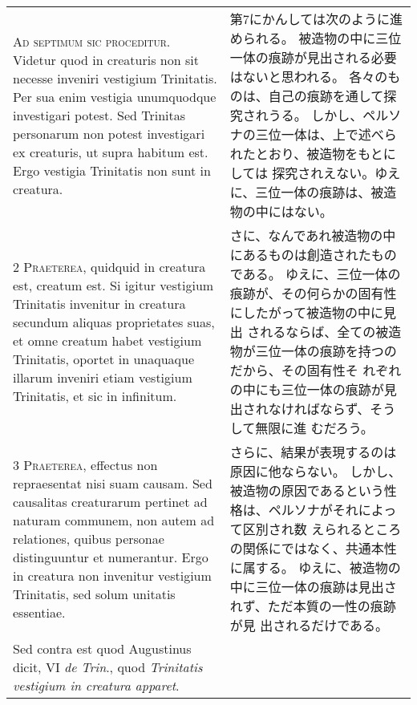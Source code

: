 \documentclass[10pt]{jsarticle} %
\begin{document}
\begin{longtable}{p{21em}p{21em}}

{\huge A}{\scshape d septimum sic proceditur}. Videtur quod in
 creaturis non sit necesse inveniri vestigium Trinitatis. Per sua enim
 vestigia unumquodque investigari potest. Sed Trinitas personarum non
 potest investigari ex creaturis, ut supra habitum est. Ergo vestigia
 Trinitatis non sunt in creatura.


&

第7にかんしては次のように進められる。
被造物の中に三位一体の痕跡が見出される必要はないと思われる。
各々のものは、自己の痕跡を通して探究されうる。
しかし、ペルソナの三位一体は、上で述べられたとおり、被造物をもとにしては
 探究されえない。ゆえに、三位一体の痕跡は、被造物の中にはない。

\\



{\scshape 2 Praeterea}, quidquid in creatura est,
 creatum est. Si igitur vestigium Trinitatis invenitur in creatura
 secundum aliquas proprietates suas, et omne creatum habet vestigium
 Trinitatis, oportet in unaquaque illarum inveniri etiam vestigium
 Trinitatis, et sic in infinitum.

&

さに、なんであれ被造物の中にあるものは創造されたものである。
ゆえに、三位一体の痕跡が、その何らかの固有性にしたがって被造物の中に見出
 されるならば、全ての被造物が三位一体の痕跡を持つのだから、その固有性そ
 れぞれの中にも三位一体の痕跡が見出されなければならず、そうして無限に進
 むだろう。

\\


{\scshape 3 Praeterea}, effectus non repraesentat nisi
 suam causam. Sed causalitas creaturarum pertinet ad naturam communem,
 non autem ad relationes, quibus personae distinguuntur et
 numerantur. Ergo in creatura non invenitur vestigium Trinitatis, sed
 solum unitatis essentiae.


&

さらに、結果が表現するのは原因に他ならない。
しかし、被造物の原因であるという性格は、ペルソナがそれによって区別され数
 えられるところの関係にではなく、共通本性に属する。
ゆえに、被造物の中に三位一体の痕跡は見出されず、ただ本質の一性の痕跡が見
 出されるだけである。

\\



 Sed contra est quod Augustinus dicit, VI {\itshape de
 Trin}., quod {\itshape Trinitatis vestigium in creatura apparet}.



\end{longtable}
\end{document}
